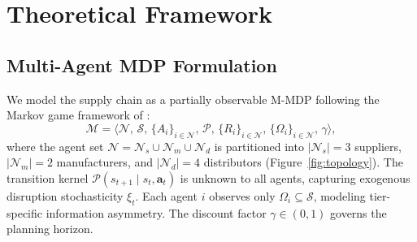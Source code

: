 \documentclass[11pt,a4paper]{article}
\theoremstyle{plain}
\theoremstyle{definition}
\newcommand{\N}{\mathcal{N}}
\newcommand{\M}{\mathcal{M}}
\newcommand{\cS}{\mathcal{S}}
\begin{document}
\section{Theoretical Framework}
\label{sec:theory}

\subsection{Multi-Agent MDP Formulation}
\label{sec:formulation}

We model the supply chain as a partially observable M-MDP following the Markov game
framework of \citet{lowe2017multi}:
\begin{equation}
\M = \bigl\langle \N,\,\cS,\,\{A_i\}_{i\in\N},\,\mathcal{P},\,\{R_i\}_{i\in\N},\,
                  \{\Omega_i\}_{i\in\N},\,\gamma \bigr\rangle,
\label{eq:mmdp}
\end{equation}
where the agent set $\N = \N_s\cup\N_m\cup\N_d$ is partitioned into $|\N_s|=3$ suppliers,
$|\N_m|=2$ manufacturers, and $|\N_d|=4$ distributors (Figure~\ref{fig:topology}).  The
transition kernel $\mathcal{P}(s_{t+1}\mid s_t,\mathbf{a}_t)$ is unknown to all agents,
capturing exogenous disruption stochasticity $\xi_t$.  Each agent $i$ observes only
$\Omega_i\subseteq\cS$, modeling tier-specific information asymmetry.  The discount factor
$\gamma\in(0,1)$ governs the planning horizon.
\end{document}
